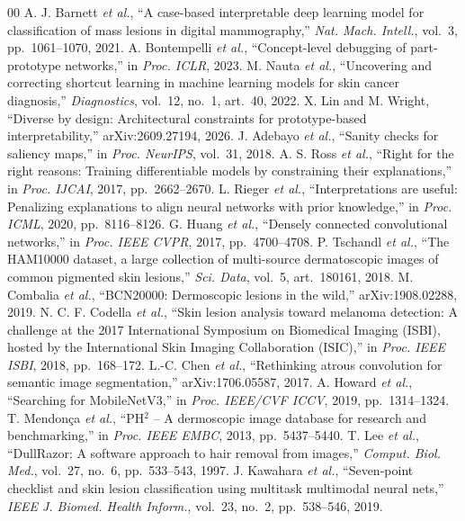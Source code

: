 \documentclass[conference]{IEEEtran}
\begin{document}
\begin{thebibliography}{00}
 A. J. Barnett \emph{et al.}, ``A case-based interpretable deep learning model for classification of mass lesions in digital mammography,'' \emph{Nat. Mach. Intell.}, vol.~3, pp.~1061--1070, 2021.
 A. Bontempelli \emph{et al.}, ``Concept-level debugging of part-prototype networks,'' in \emph{Proc. ICLR}, 2023.
 M. Nauta \emph{et al.}, ``Uncovering and correcting shortcut learning in machine learning models for skin cancer diagnosis,'' \emph{Diagnostics}, vol.~12, no.~1, art.~40, 2022.
 X. Lin and M. Wright, ``Diverse by design: Architectural constraints for prototype-based interpretability,'' arXiv:2609.27194, 2026.
 J. Adebayo \emph{et al.}, ``Sanity checks for saliency maps,'' in \emph{Proc. NeurIPS}, vol.~31, 2018.
 A. S. Ross \emph{et al.}, ``Right for the right reasons: Training differentiable models by constraining their explanations,'' in \emph{Proc. IJCAI}, 2017, pp.~2662--2670.
 L. Rieger \emph{et al.}, ``Interpretations are useful: Penalizing explanations to align neural networks with prior knowledge,'' in \emph{Proc. ICML}, 2020, pp.~8116--8126.
 G. Huang \emph{et al.}, ``Densely connected convolutional networks,'' in \emph{Proc. IEEE CVPR}, 2017, pp.~4700--4708.
 P. Tschandl \emph{et al.}, ``The HAM10000 dataset, a large collection of multi-source dermatoscopic images of common pigmented skin lesions,'' \emph{Sci. Data}, vol.~5, art.~180161, 2018.
 M. Combalia \emph{et al.}, ``BCN20000: Dermoscopic lesions in the wild,'' arXiv:1908.02288, 2019.
 N. C. F. Codella \emph{et al.}, ``Skin lesion analysis toward melanoma detection: A challenge at the 2017 International Symposium on Biomedical Imaging (ISBI), hosted by the International Skin Imaging Collaboration (ISIC),'' in \emph{Proc. IEEE ISBI}, 2018, pp.~168--172.
 L.-C. Chen \emph{et al.}, ``Rethinking atrous convolution for semantic image segmentation,'' arXiv:1706.05587, 2017.
 A. Howard \emph{et al.}, ``Searching for MobileNetV3,'' in \emph{Proc. IEEE/CVF ICCV}, 2019, pp.~1314--1324.
 T. Mendon\c{c}a \emph{et al.}, ``PH$^2$ -- A dermoscopic image database for research and benchmarking,'' in \emph{Proc. IEEE EMBC}, 2013, pp.~5437--5440.
 T. Lee \emph{et al.}, ``DullRazor: A software approach to hair removal from images,'' \emph{Comput. Biol. Med.}, vol.~27, no.~6, pp.~533--543, 1997.
 J. Kawahara \emph{et al.}, ``Seven-point checklist and skin lesion classification using multitask multimodal neural nets,'' \emph{IEEE J. Biomed. Health Inform.}, vol.~23, no.~2, pp.~538--546, 2019.

\end{thebibliography}
\end{document}
